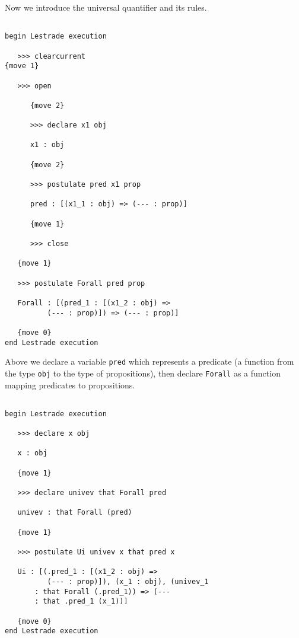 \documentclass[12pt]{article}
\begin{document}
\newpage

Now we introduce the universal quantifier and its rules.

\begin{verbatim}

begin Lestrade execution

   >>> clearcurrent
{move 1}

   >>> open

      {move 2}

      >>> declare x1 obj

      x1 : obj

      {move 2}

      >>> postulate pred x1 prop

      pred : [(x1_1 : obj) => (--- : prop)]

      {move 1}

      >>> close

   {move 1}

   >>> postulate Forall pred prop

   Forall : [(pred_1 : [(x1_2 : obj) => 
          (--- : prop)]) => (--- : prop)]

   {move 0}
end Lestrade execution

\end{verbatim}

Above we declare a variable {\tt pred} which represents a predicate (a function from the type {\tt obj}
to the type of propositions), then declare {\tt Forall} as a function mapping predicates to propositions.

\begin{verbatim}

begin Lestrade execution

   >>> declare x obj

   x : obj

   {move 1}

   >>> declare univev that Forall pred

   univev : that Forall (pred)

   {move 1}

   >>> postulate Ui univev x that pred x

   Ui : [(.pred_1 : [(x1_2 : obj) => 
          (--- : prop)]), (x_1 : obj), (univev_1 
       : that Forall (.pred_1)) => (--- 
       : that .pred_1 (x_1))]

   {move 0}
end Lestrade execution

\end{verbatim}
\end{document}
